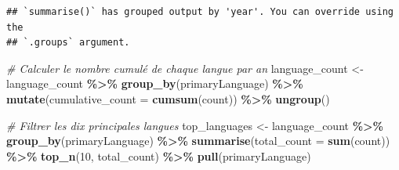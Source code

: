\documentclass[
]{article}
\newenvironment{Shaded}{\begin{snugshade}}{\end{snugshade}}
\newcommand{\AttributeTok}[1]{\textcolor[rgb]{0.13,0.29,0.53}{#1}}
\newcommand{\CommentTok}[1]{\textcolor[rgb]{0.56,0.35,0.01}{\textit{#1}}}
\newcommand{\DecValTok}[1]{\textcolor[rgb]{0.00,0.00,0.81}{#1}}
\newcommand{\FunctionTok}[1]{\textcolor[rgb]{0.13,0.29,0.53}{\textbf{#1}}}
\newcommand{\NormalTok}[1]{#1}
\newcommand{\OtherTok}[1]{\textcolor[rgb]{0.56,0.35,0.01}{#1}}
\newcommand{\SpecialCharTok}[1]{\textcolor[rgb]{0.81,0.36,0.00}{\textbf{#1}}}
\begin{document}
\begin{verbatim}
## `summarise()` has grouped output by 'year'. You can override using the
## `.groups` argument.
\end{verbatim}

\begin{Shaded}
\begin{Highlighting}[]
\CommentTok{\# Calculer le nombre cumulé de chaque langue par an}
\NormalTok{language\_count }\OtherTok{\textless{}{-}}\NormalTok{ language\_count }\SpecialCharTok{\%\textgreater{}\%}
  \FunctionTok{group\_by}\NormalTok{(primaryLanguage) }\SpecialCharTok{\%\textgreater{}\%}
  \FunctionTok{mutate}\NormalTok{(}\AttributeTok{cumulative\_count =} \FunctionTok{cumsum}\NormalTok{(count)) }\SpecialCharTok{\%\textgreater{}\%}
  \FunctionTok{ungroup}\NormalTok{()}


\CommentTok{\# Filtrer les dix principales langues}
\NormalTok{top\_languages }\OtherTok{\textless{}{-}}\NormalTok{ language\_count }\SpecialCharTok{\%\textgreater{}\%}
  \FunctionTok{group\_by}\NormalTok{(primaryLanguage) }\SpecialCharTok{\%\textgreater{}\%}
  \FunctionTok{summarise}\NormalTok{(}\AttributeTok{total\_count =} \FunctionTok{sum}\NormalTok{(count)) }\SpecialCharTok{\%\textgreater{}\%}
  \FunctionTok{top\_n}\NormalTok{(}\DecValTok{10}\NormalTok{, total\_count) }\SpecialCharTok{\%\textgreater{}\%}
  \FunctionTok{pull}\NormalTok{(primaryLanguage)}
\end{Highlighting}
\end{Shaded}
\end{document}
